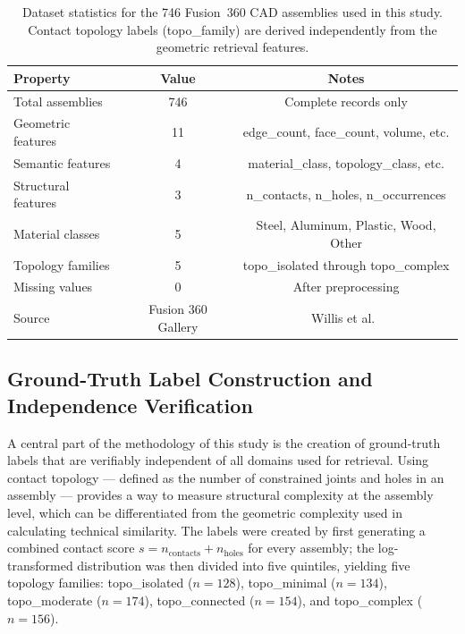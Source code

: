 \documentclass[preprint,12pt]{elsarticle}
\begin{document}
\begin{table}[!ht]
\centering
\caption{Dataset statistics for the 746 Fusion~360 CAD assemblies used in this study. Contact topology labels (topo\_family) are derived independently from the geometric retrieval features.}
\label{tab:DatasetStats}
\begin{tabular}{lcc}
\toprule
\textbf{Property} & \textbf{Value} & \textbf{Notes} \\
\midrule
Total assemblies & 746 & Complete records only \\
Geometric features & 11 & edge\_count, face\_count, volume, etc. \\
Semantic features & 4 & material\_class, topology\_class, etc. \\
Structural features & 3 & n\_contacts, n\_holes, n\_occurrences \\
Material classes & 5 & Steel, Aluminum, Plastic, Wood, Other \\
Topology families & 5 & topo\_isolated through topo\_complex \\
Missing values & 0 & After preprocessing \\
Source & Fusion 360 Gallery & Willis et al.~\cite{Willis2021} \\
\bottomrule
\end{tabular}
\end{table}

\subsection{Ground-Truth Label Construction and Independence Verification}

A central part of the methodology of this study is the creation of ground-truth labels that are verifiably independent of all domains used for retrieval.
Using contact topology --- defined as the number of constrained joints and holes in an assembly --- provides a way to measure structural complexity at the assembly level, which can be differentiated from the geometric complexity used in calculating technical similarity.
The labels were created by first generating a combined contact score $s = n_{\text{contacts}} + n_{\text{holes}}$ for every assembly; the log-transformed distribution was then divided into five quintiles, yielding five topology families: topo\_isolated ($n{=}128$), topo\_minimal ($n{=}134$), topo\_moderate ($n{=}174$), topo\_connected ($n{=}154$), and topo\_complex ($n{=}156$).
\end{document}
